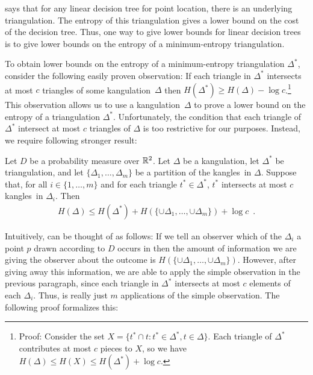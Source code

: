 \documentclass[charterfonts,lotsofwhite]{patmorin}
\newcommand{\kangles}{kangles}
\newcommand{\kangulation}{kangulation}
\begin{document}
 says that for any linear decision tree for point
location, there is an underlying triangulation.  The entropy of this
triangulation gives a lower bound on the cost of the decision tree.
Thus, one way to give lower bounds for linear decision trees is to
give lower bounds on the entropy of a minimum-entropy triangulation.

To obtain lower bounds on the entropy of a minimum-entropy
triangulation $\Delta^*$, consider the following easily proven
observation: If each triangle in $\Delta^*$ intersects at most $c$
triangles of some \kangulation\ $\Delta$ then $H(\Delta^*) \ge
H(\Delta) - \log c$.\footnote{Proof: Consider the set $X=\{
t^*\cap t : t^*\in\Delta^*, t\in \Delta\}$. Each triangle of
$\Delta^*$ contributes at most $c$ pieces to $X$, so we have
$H(\Delta) \le H(X) \le H(\Delta^*) + \log c$.}  This observation
allows us to use a \kangulation\ $\Delta$ to prove a lower bound on
the entropy of a triangulation $\Delta^*$.  Unfortunately, the
condition that each triangle of $\Delta^*$ intersect at most $c$
triangles of $\Delta$ is too restrictive for our purposes.  Instead,
we require following stronger result:

\begin{lem}
Let $D$ be a probability measure over $\mathbb{R}^2$.  Let $\Delta$ be a
\kangulation, let $\Delta^*$ be triangulation, and let
$\{\Delta_1,\ldots,\Delta_m\}$ be a partition of the \kangles\
in $\Delta$.  Suppose that, for all $i\in\{1,\ldots,m\}$ and for each
triangle $t^*\in\Delta^*$, $t^*$ intersects
at most $c$ \kangles\ in $\Delta_i$.  Then
\begin{eqnarray*}
   H(\Delta) \le 
	 H(\Delta^*) + H(\{\cup\Delta_1,\ldots,\cup\Delta_m\}) + \log c
 \enspace . 
\end{eqnarray*}
\end{lem}

Intuitively,  can be thought of as follows:  If we tell
an observer which of the $\Delta_i$ a point $p$ drawn according to $D$
occurs in then the amount of information we are giving the observer
about the outcome is $H(\{\cup\Delta_1,\ldots,\cup\Delta_m\})$.
However, after giving away this information, we are able to apply the
simple observation in the previous paragraph, since each triangle in
$\Delta^*$ intersects at most $c$ elements of each $\Delta_i$.  Thus,
\lemref{pieces} is really just $m$ applications of the simple
observation.  The following proof formalizes this:
\end{document}
